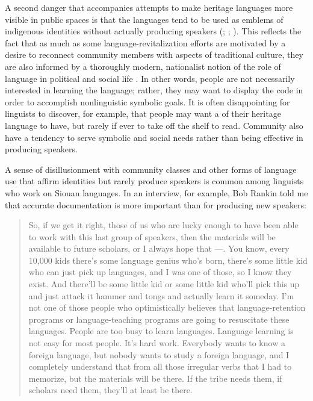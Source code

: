 \documentclass[output=paper]{LSP/langsci}
\begin{document}
A second danger that accompanies attempts to make heritage languages more visible in public spaces is that the languages tend to be used as emblems of indigenous identities without actually producing speakers (\citealt{Ahlers2006}; \citealt[98]{DauenhauerDauenhauer1998}; \citealt[715]{Whiteley2003}). This reflects the fact that as much as some language-revitalization efforts are motivated by a desire to reconnect community members with aspects of traditional culture, they are also informed by a thoroughly modern, nationalist notion of the role of language in political and social life \citep{KroskrityField2009, Nevins2013}. In other words, people are not necessarily interested in learning the language; rather, they may want to display the code in order to accomplish nonlinguistic symbolic goals. It is often disappointing for linguists to discover, for example, that people may want a  of their heritage language to have, but rarely if ever to take off the shelf to read. Community  also have a tendency to serve symbolic and social needs rather than being effective in producing speakers. 

A sense of disillusionment with community classes and other forms of language use that affirm identities but rarely produce speakers is common among linguists who work on Siouan languages. In an interview, for example, Bob Rankin told me that accurate documentation is more important than  for producing new speakers:

\begin{quote} So, if we get it right, those of us who are lucky enough to have been able to work with this last group of speakers, then the materials will be available to future scholars, or I always hope that ---. You know, every 10,000 kids there's some language genius who's born, there's some little kid who can just pick up languages, and I was one of those, so I know they exist. And there'll be some little  kid or some little  kid who'll pick this up and just attack it hammer and tongs and actually learn it someday. I'm not one of those people who optimistically believes that language-retention programs or language-teaching programs are going to resuscitate these languages. People are too busy to learn languages. Language learning is not easy for most people. It's hard work. Everybody wants to know a foreign language, but nobody wants to study a foreign language, and I completely understand that from all those  irregular verbs that I had to memorize, but the materials will be there. If the tribe needs them, if scholars need them, they'll at least be there.\end{quote}
\end{document}
